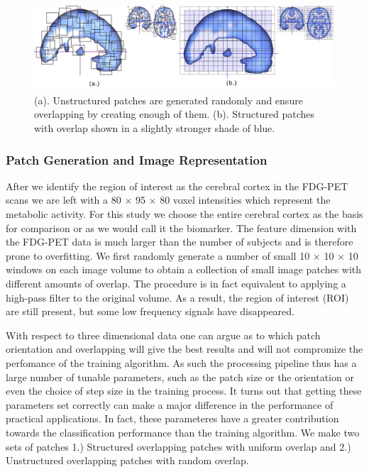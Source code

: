 \documentclass[authoryear,preprint,revi	ew,12pt]{elsarticle}
\begin{document}
\begin{figure}
	\centering
	\includegraphics[width=\linewidth]{figures/patches}
	\caption[Unstructured and Structured patches in Axial, Sagittal and Coronal view of the brain.]{(a). Unstructured patches are generated randomly and ensure overlapping by creating enough of them. (b). Structured patches with overlap shown in a slightly stronger shade of blue.}
	\label{fig:patches}
\end{figure}

\subsubsection{Patch Generation and Image Representation}
\label{sec:patch_generation}
After we identify the region of interest as the cerebral cortex in the FDG-PET scans we are left with a 80 $ \times $ 95 $ \times $ 80 voxel intensities which represent the metabolic activity. For this study we choose the entire cerebral cortex as the basis for comparison or as we would call it the biomarker. The feature dimension with the FDG-PET data is much larger than the number of subjects and is therefore prone to overfitting. We first randomly generate a number of small 10 $ \times $ 10 $ \times $ 10 windows on each image volume to obtain a collection of small image patches with different amounts of overlap. The procedure is in fact equivalent to applying a high-pass filter to the original volume. As a result, the region of interest (ROI) are still present, but some low frequency signals have disappeared. 

With respect to three dimensional data one can argue as to which patch orientation and overlapping will give the best results and will not compromize the perfomance of the training algorithm. As such the processing pipeline thus has a large number of tunable parameters, such as the patch size or the orientation or even the choice of step size in the training process. It turns out that getting these parameters set correctly can make a major difference in the performance of practical applications. In fact, these parameteres have a greater contribution towards the classification performance than the training algorithm. We make two sets of patches 1.) Structured overlapping patches with uniform overlap and 2.) Unstructured overlapping patches with random overlap.
\end{document}

